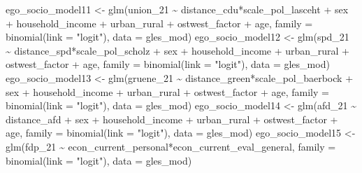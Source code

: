 \documentclass[
]{article}
\newenvironment{Shaded}{\begin{snugshade}}{\end{snugshade}}
\newcommand{\AttributeTok}[1]{\textcolor[rgb]{0.77,0.63,0.00}{#1}}
\newcommand{\FunctionTok}[1]{\textcolor[rgb]{0.00,0.00,0.00}{#1}}
\newcommand{\NormalTok}[1]{#1}
\newcommand{\OtherTok}[1]{\textcolor[rgb]{0.56,0.35,0.01}{#1}}
\newcommand{\SpecialCharTok}[1]{\textcolor[rgb]{0.00,0.00,0.00}{#1}}
\newcommand{\StringTok}[1]{\textcolor[rgb]{0.31,0.60,0.02}{#1}}
\begin{document}
\begin{Shaded}
\begin{Highlighting}[]
\NormalTok{ego\_socio\_model11 }\OtherTok{\textless{}{-}} \FunctionTok{glm}\NormalTok{(union\_21 }\SpecialCharTok{\textasciitilde{}}\NormalTok{ distance\_cdu}\SpecialCharTok{*}\NormalTok{scale\_pol\_lasceht }\SpecialCharTok{+}\NormalTok{ sex }\SpecialCharTok{+}\NormalTok{ household\_income }\SpecialCharTok{+}\NormalTok{ urban\_rural }\SpecialCharTok{+}\NormalTok{ ostwest\_factor }\SpecialCharTok{+}\NormalTok{ age,}
                       \AttributeTok{family =} \FunctionTok{binomial}\NormalTok{(}\AttributeTok{link =} \StringTok{"logit"}\NormalTok{),}
                       \AttributeTok{data =}\NormalTok{ gles\_mod)}
\NormalTok{ego\_socio\_model12 }\OtherTok{\textless{}{-}} \FunctionTok{glm}\NormalTok{(spd\_21 }\SpecialCharTok{\textasciitilde{}}\NormalTok{ distance\_spd}\SpecialCharTok{*}\NormalTok{scale\_pol\_scholz }\SpecialCharTok{+}\NormalTok{ sex }\SpecialCharTok{+}\NormalTok{ household\_income }\SpecialCharTok{+}\NormalTok{ urban\_rural }\SpecialCharTok{+}\NormalTok{ ostwest\_factor }\SpecialCharTok{+}\NormalTok{ age,}
                       \AttributeTok{family =} \FunctionTok{binomial}\NormalTok{(}\AttributeTok{link =} \StringTok{"logit"}\NormalTok{),}
                       \AttributeTok{data =}\NormalTok{ gles\_mod)}
\NormalTok{ego\_socio\_model13 }\OtherTok{\textless{}{-}} \FunctionTok{glm}\NormalTok{(gruene\_21 }\SpecialCharTok{\textasciitilde{}}\NormalTok{ distance\_green}\SpecialCharTok{*}\NormalTok{scale\_pol\_baerbock }\SpecialCharTok{+}\NormalTok{ sex }\SpecialCharTok{+}\NormalTok{ household\_income }\SpecialCharTok{+}\NormalTok{ urban\_rural }\SpecialCharTok{+}\NormalTok{ ostwest\_factor }\SpecialCharTok{+}\NormalTok{ age,}
                       \AttributeTok{family =} \FunctionTok{binomial}\NormalTok{(}\AttributeTok{link =} \StringTok{"logit"}\NormalTok{),}
                       \AttributeTok{data =}\NormalTok{ gles\_mod)}
\NormalTok{ego\_socio\_model14 }\OtherTok{\textless{}{-}} \FunctionTok{glm}\NormalTok{(afd\_21 }\SpecialCharTok{\textasciitilde{}}\NormalTok{ distance\_afd }\SpecialCharTok{+}\NormalTok{ sex }\SpecialCharTok{+}\NormalTok{ household\_income }\SpecialCharTok{+}\NormalTok{ urban\_rural }\SpecialCharTok{+}\NormalTok{ ostwest\_factor }\SpecialCharTok{+}\NormalTok{ age,}
                       \AttributeTok{family =} \FunctionTok{binomial}\NormalTok{(}\AttributeTok{link =} \StringTok{"logit"}\NormalTok{),}
                       \AttributeTok{data =}\NormalTok{ gles\_mod)}
\NormalTok{ego\_socio\_model15 }\OtherTok{\textless{}{-}} \FunctionTok{glm}\NormalTok{(fdp\_21 }\SpecialCharTok{\textasciitilde{}}\NormalTok{ econ\_current\_personal}\SpecialCharTok{*}\NormalTok{econ\_current\_eval\_general,}
                       \AttributeTok{family =} \FunctionTok{binomial}\NormalTok{(}\AttributeTok{link =} \StringTok{"logit"}\NormalTok{),}
                       \AttributeTok{data =}\NormalTok{ gles\_mod)}


\end{Highlighting}
\end{Shaded}
\end{document}
